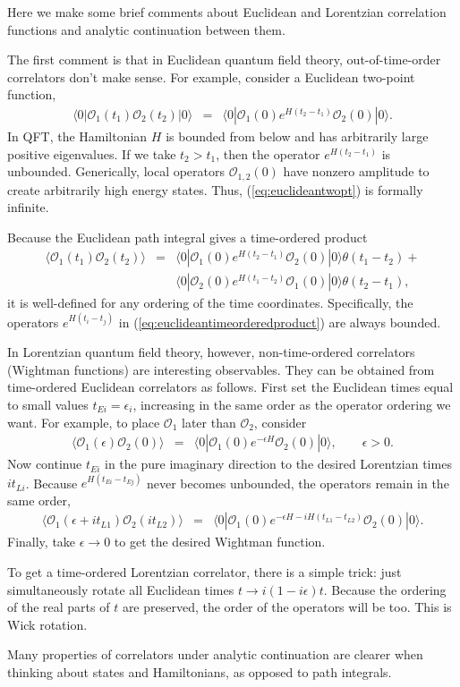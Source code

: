 \documentclass[11pt]{ws-rv9x6}
\newcommand\be{\begin{eqnarray}}
\newcommand\ee{\end{eqnarray}}
\newcommand\cO{\mathcal{O}}
\newcommand\e\epsilon
\newcommand\<\langle
\renewcommand\>\rangle
\newcommand\nn{\nonumber}
\renewcommand\.{\cdot}
\renewcommand\th{\theta}
\begin{document}
\begin{appendix}
\label{app:analyticcontinuation}

Here we make some brief comments about Euclidean and Lorentzian correlation functions and analytic continuation between them.  

The first comment is that in Euclidean quantum field theory, out-of-time-order correlators don't make sense.  For example, consider a Euclidean two-point function,
\be
\label{eq:euclideantwopt}
\<0|\cO_1(t_1)\cO_2(t_2)|0\> &=& \<0| \cO_1(0) e^{H(t_2-t_1)} \cO_2(0)|0\>.
\ee
In QFT, the Hamiltonian $H$ is bounded from below and has arbitrarily large positive eigenvalues.  If we take $t_2 > t_1$, then the operator $e^{H(t_2-t_1)}$ is unbounded.  Generically, local operators $\cO_{1,2}(0)$ have nonzero amplitude to create arbitrarily high energy states. Thus, (\ref{eq:euclideantwopt}) is formally infinite.

Because the Euclidean path integral gives a time-ordered product
\be
\label{eq:euclideantimeorderedproduct}
\<\cO_1(t_1)\cO_2(t_2)\> &=& \<0|\cO_1(0)e^{H(t_2-t_1)}\cO_2(0)|0\>\th(t_1-t_2)+\nn\\
&& \<0|\cO_2(0)e^{H(t_1-t_2)}\cO_1(0)|0\>\th(t_2-t_1),
\ee
it is well-defined for any ordering of the time coordinates. Specifically, the operators $e^{H(t_i-t_j)}$ in (\ref{eq:euclideantimeorderedproduct}) are always bounded.

In Lorentzian quantum field theory, however,  non-time-ordered correlators (Wightman functions) are interesting observables.  They can be obtained from time-ordered Euclidean correlators as follows.  First set the Euclidean times equal to small values $t_{Ei}=\e_i$, increasing in the same order as the operator ordering we want.  For example, to place $\cO_1$ later than $\cO_2$, consider
\be
\<\cO_1(\e)\cO_2(0)\> &=& \<0|\cO_1(0)e^{-\e H}\cO_2(0)|0\>,\qquad \e>0.
\ee
Now continue $t_{Ei}$ in the pure imaginary direction to the desired Lorentzian times $it_{Li}$.  Because $e^{H(t_{Ei}-t_{Ej})}$ never becomes unbounded, the operators remain in the same order,
\be
\<\cO_1(\e+i t_{L1})\cO_2(it_{L2})\> &=& \<0|\cO_1(0)e^{-\e H - iH(t_{L1}-t_{L2})}\cO_2(0)|0\>.
\ee
Finally, take $\e\to 0$ to get the desired Wightman function.

To get a time-ordered Lorentzian correlator, there is a simple trick: just simultaneously rotate all Euclidean times $t\to i (1-i\e) t$. Because the ordering of the real parts of $t$ are preserved, the order of the operators will be too. This is Wick rotation.

Many properties of correlators under analytic continuation are clearer when thinking about states and Hamiltonians, as opposed to path integrals.

\vspace{0.2in}

\end{appendix}
\end{document}
